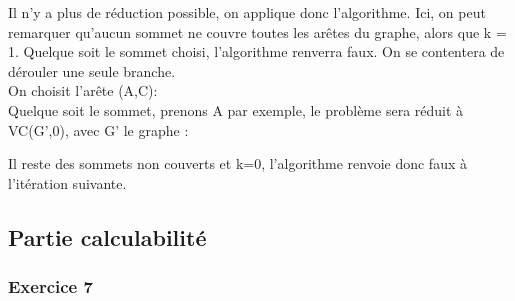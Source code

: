 \documentclass[]{article}
\begin{document}
\begin{enumerate}
\begin{enumerate}
\begin{enumerate}
\begin{center}
\end{center}
\vspace*{7mm}
Il n'y a plus de réduction possible, on applique donc l'algorithme. Ici, on peut remarquer qu'aucun sommet ne couvre toutes les arêtes du graphe, alors que k = 1. Quelque soit le sommet choisi, l'algorithme renverra faux. On se contentera de dérouler une seule branche.\\
On choisit l'arête (A,C):\\
Quelque soit le sommet, prenons A par exemple, le problème sera réduit à VC(G',0), avec G' le graphe :\\
\begin{center}
\end{center}
\vspace*{7mm}
Il reste des sommets non couverts et k=0, l'algorithme renvoie donc faux à l'itération suivante.\\
\end{enumerate}
\end{enumerate}
\end{enumerate}

\subsection{Partie calculabilité}



\subsubsection{Exercice 7}
\end{document}
